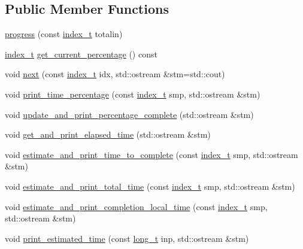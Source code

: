 \subsection*{\-Public \-Member \-Functions}
\begin{DoxyCompactItemize}
\item 
\hyperlink{classmcpele_1_1progress_a85b33747573822894e73648ab9d39283}{progress} (const \hyperlink{classmcpele_1_1progress_a3af9df6e1a8f337ef00e368820377316}{index\-\_\-t} totalin)
\item 
\hyperlink{classmcpele_1_1progress_a3af9df6e1a8f337ef00e368820377316}{index\-\_\-t} \hyperlink{classmcpele_1_1progress_a5d43020edf40edcc80aacdd6d20ee381}{get\-\_\-current\-\_\-percentage} () const 
\item 
void \hyperlink{classmcpele_1_1progress_aefd26e12135e0b12f7b69ed09ca93822}{next} (const \hyperlink{classmcpele_1_1progress_a3af9df6e1a8f337ef00e368820377316}{index\-\_\-t} idx, std\-::ostream \&stm=std\-::cout)
\item 
void \hyperlink{classmcpele_1_1progress_a714ca1e3fd28ce6fd8b08b6dca897bb8}{print\-\_\-time\-\_\-percentage} (const \hyperlink{classmcpele_1_1progress_a3af9df6e1a8f337ef00e368820377316}{index\-\_\-t} smp, std\-::ostream \&stm)
\item 
void \hyperlink{classmcpele_1_1progress_ae1bf4cc3061af7aebc8e2e47e2a0d7ac}{update\-\_\-and\-\_\-print\-\_\-percentage\-\_\-complete} (std\-::ostream \&stm)
\item 
void \hyperlink{classmcpele_1_1progress_ac0d3ff0e4d19c907998a6d7e79028684}{get\-\_\-and\-\_\-print\-\_\-elapsed\-\_\-time} (std\-::ostream \&stm)
\item 
void \hyperlink{classmcpele_1_1progress_abc1242a755e95d3e5e42c8d51f9ac111}{estimate\-\_\-and\-\_\-print\-\_\-time\-\_\-to\-\_\-complete} (const \hyperlink{classmcpele_1_1progress_a3af9df6e1a8f337ef00e368820377316}{index\-\_\-t} smp, std\-::ostream \&stm)
\item 
void \hyperlink{classmcpele_1_1progress_a269dd163562c738119be1d0eb62ff593}{estimate\-\_\-and\-\_\-print\-\_\-total\-\_\-time} (const \hyperlink{classmcpele_1_1progress_a3af9df6e1a8f337ef00e368820377316}{index\-\_\-t} smp, std\-::ostream \&stm)
\item 
void \hyperlink{classmcpele_1_1progress_a8d4b8ff4bbe4cf820310a7bdaef520be}{estimate\-\_\-and\-\_\-print\-\_\-completion\-\_\-local\-\_\-time} (const \hyperlink{classmcpele_1_1progress_a3af9df6e1a8f337ef00e368820377316}{index\-\_\-t} smp, std\-::ostream \&stm)
\item 
void \hyperlink{classmcpele_1_1progress_a786d5d4edd6dd3e34fc0acc77a7bf548}{print\-\_\-estimated\-\_\-time} (const \hyperlink{classmcpele_1_1progress_aca882b448ea2df62757b62ccdcf72064}{long\-\_\-t} inp, std\-::ostream \&stm)
\end{DoxyCompactItemize}


